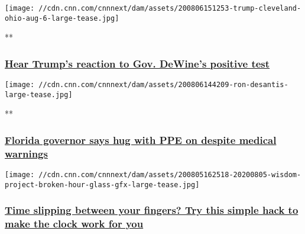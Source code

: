 \href{/videos/politics/2020/08/06/mike-dewine-coronavirus-positive-trump-reaction-nobles-sot-nr-vpx.cnn}{}

\texttt{[image: //cdn.cnn.com/cnnnext/dam/assets/200806151253-trump-cleveland-ohio-aug-6-large-tease.jpg]}

**

\hypertarget{hear-trumps-reaction-to-gov-dewines-positive-test}{%
\subsubsection{\texorpdfstring{\href{/videos/politics/2020/08/06/mike-dewine-coronavirus-positive-trump-reaction-nobles-sot-nr-vpx.cnn}{Hear
Trump's reaction to Gov. DeWine's positive
test}}{Hear Trump's reaction to Gov. DeWine's positive test}}\label{hear-trumps-reaction-to-gov-dewines-positive-test}}

\href{/videos/health/2020/08/06/dr-adrian-burrowes-intv-gov-ron-desantis-florida-hug-ppe-coronavirus-reckless-sot-nr-vpx.cnn}{}

\texttt{[image: //cdn.cnn.com/cnnnext/dam/assets/200806144209-ron-desantis-large-tease.jpg]}

**

\hypertarget{florida-governor-says-hug-with-ppe-on-despite-medical-warnings}{%
\subsubsection{\texorpdfstring{\href{/videos/health/2020/08/06/dr-adrian-burrowes-intv-gov-ron-desantis-florida-hug-ppe-coronavirus-reckless-sot-nr-vpx.cnn}{Florida
governor says hug with PPE on despite medical
warnings}}{Florida governor says hug with PPE on despite medical warnings}}\label{florida-governor-says-hug-with-ppe-on-despite-medical-warnings}}

\href{/2020/08/06/health/time-saving-pomodoro-technique-wisdom-project-wellness/index.html}{}

\texttt{[image: //cdn.cnn.com/cnnnext/dam/assets/200805162518-20200805-wisdom-project-broken-hour-glass-gfx-large-tease.jpg]}

\hypertarget{time-slipping-between-your-fingers-try-this-simple-hack-to-make-the-clock-work-for-you-1}{%
\subsubsection{\texorpdfstring{\href{/2020/08/06/health/time-saving-pomodoro-technique-wisdom-project-wellness/index.html}{Time
slipping between your fingers? Try this simple hack to make the clock
work for
you}}{Time slipping between your fingers? Try this simple hack to make the clock work for you}}\label{time-slipping-between-your-fingers-try-this-simple-hack-to-make-the-clock-work-for-you-1}}

